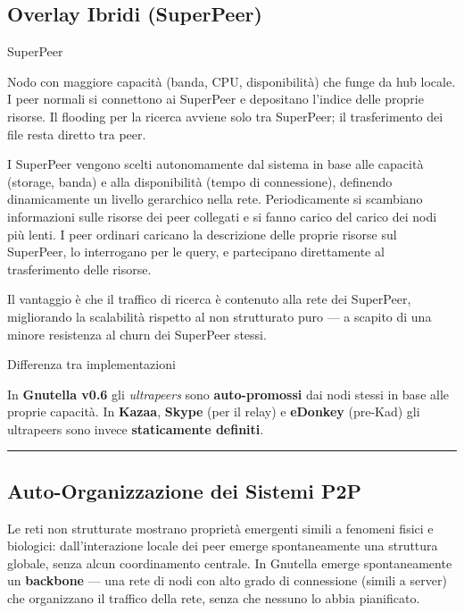 \documentclass[
  italian,
  openany]{book}
\begin{document}
\subsection{Overlay Ibridi (SuperPeer)}\label{overlay-ibridi-superpeer}

\begin{calloutdefinition}{SuperPeer}

Nodo con maggiore capacità (banda, CPU, disponibilità) che funge da hub
locale. I peer normali si connettono ai SuperPeer e depositano l'indice
delle proprie risorse. Il flooding per la ricerca avviene solo tra
SuperPeer; il trasferimento dei file resta diretto tra peer.

\end{calloutdefinition}

I SuperPeer vengono scelti autonomamente dal sistema in base alle
capacità (storage, banda) e alla disponibilità (tempo di connessione),
definendo dinamicamente un livello gerarchico nella rete. Periodicamente
si scambiano informazioni sulle risorse dei peer collegati e si fanno
carico del carico dei nodi più lenti. I peer ordinari caricano la
descrizione delle proprie risorse sul SuperPeer, lo interrogano per le
query, e partecipano direttamente al trasferimento delle risorse.

Il vantaggio è che il traffico di ricerca è contenuto alla rete dei
SuperPeer, migliorando la scalabilità rispetto al non strutturato puro
--- a scapito di una minore resistenza al churn dei SuperPeer stessi.

\begin{calloutnote}{Differenza tra implementazioni}

In \textbf{Gnutella v0.6} gli \emph{ultrapeers} sono
\textbf{auto-promossi} dai nodi stessi in base alle proprie capacità. In
\textbf{Kazaa}, \textbf{Skype} (per il relay) e \textbf{eDonkey}
(pre-Kad) gli ultrapeers sono invece \textbf{staticamente definiti}.

\end{calloutnote}

\begin{center}\rule{0.5\linewidth}{0.5pt}\end{center}

\subsection{Auto-Organizzazione dei Sistemi
P2P}\label{auto-organizzazione-dei-sistemi-p2p}

Le reti non strutturate mostrano proprietà emergenti simili a fenomeni
fisici e biologici: dall'interazione locale dei peer emerge
spontaneamente una struttura globale, senza alcun coordinamento
centrale. In Gnutella emerge spontaneamente un \textbf{backbone} --- una
rete di nodi con alto grado di connessione (simili a server) che
organizzano il traffico della rete, senza che nessuno lo abbia
pianificato.
\end{document}
